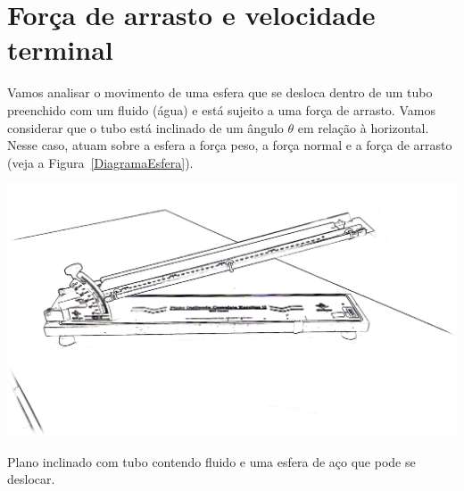 \section{Força de arrasto e velocidade terminal}
\label{SecaoF_a}

Vamos analisar o movimento de uma esfera que se desloca dentro de um tubo preenchido com um fluido (água) e está sujeito a uma força de arrasto. Vamos considerar que o tubo está inclinado de um ângulo $\theta$ em relação à horizontal. Nesse caso, atuam sobre a esfera a força peso, a força normal e a força de arrasto (veja a Figura~\ref{DiagramaEsfera}).

\begin{marginfigure}
	\includegraphics[width=\textwidth]{Ilustrations/Arrasto.png}
	\caption{Plano inclinado com tubo contendo fluido e uma esfera de aço que pode se deslocar.}
\end{marginfigure}

